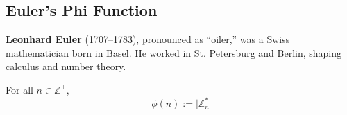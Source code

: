 \subsection{Euler's Phi Function}
\begin{Tip}
    \textbf{Leonhard Euler} (1707–1783), pronounced as ``oiler,'' was a Swiss mathematician born in Basel. He worked in St. Petersburg and Berlin, shaping calculus and number theory.
\end{Tip}

\begin{Def}
    For all $n\in\mathbb{Z^+}$,
    \[\phi(n):=|\mathbb{Z}_n^*\]
\end{Def}